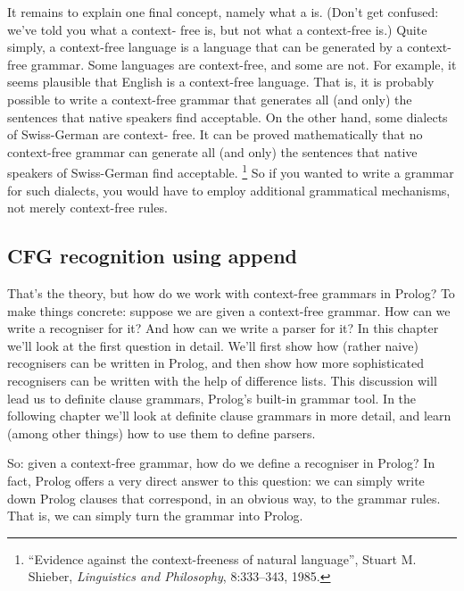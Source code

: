 \clearpage
It remains to explain one final concept, namely what a  is. (Don't get confused: we've told you what a context-
free  is, but not what a context-free
 is.)  Quite simply, a context-free language is a
language that can be generated by a context-free grammar. Some
languages are context-free, and some are not. For example, it seems
plausible that English is a context-free language. That is, it is
probably possible to write a context-free grammar that generates all
(and only) the sentences that native speakers find acceptable. On the
other hand, some dialects of Swiss-German are  context-
free. It can be proved mathematically that no context-free grammar can
generate all (and only) the sentences that native speakers of
Swiss-German find acceptable.%
\footnote{``Evidence against the context-freeness of natural language'',
Stuart M. Shieber,
\textit{Linguistics and Philosophy}, 8:333--343, 1985.}
So if you wanted to write a grammar for
such dialects, you would have to employ additional grammatical
mechanisms, not merely context-free rules.




\subsection*{CFG recognition using append}\label{SUBSEC.L7.NAIVE.IMPL}



That's the theory, but how do we work with context-free grammars in
Prolog?  To make things concrete: suppose we are given a context-free
grammar. How can we write a recogniser for it?  And how can we write a
parser for it? In this chapter we'll look at the first question in
detail.  We'll first show how (rather naive) recognisers can be
written in Prolog, and then show how more sophisticated recognisers
can be written with the help of difference lists.  This discussion
will lead us to definite clause grammars, Prolog's built-in grammar
tool.  In the following chapter we'll look at definite clause grammars
in more detail, and learn (among other things) how to use them to
define parsers.

So: given a context-free grammar, how do we define a recogniser in
Prolog?  In fact, Prolog offers a very direct answer to this question:
we can simply write down Prolog clauses that correspond, in an obvious
way, to the grammar rules.  That is, we can simply turn the grammar
into Prolog.

